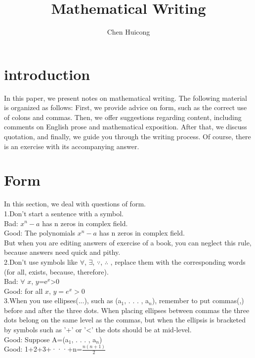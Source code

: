 \documentclass[]{article}
\title{Mathematical Writing}
\author{Chen Huicong}
\begin{document}
	
	\maketitle
	
	\tableofcontents 
	
	\newpage 
	
	\section{introduction}
	In this paper, we present notes on mathematical writing. The following material is organized as follows: First, we provide advice on form, such as the correct use of colons and commas. Then, we offer suggestions regarding content, including comments on English prose and mathematical exposition. After that, we discuss quotation, and finally, we guide you through the writing process. Of course, there is an exercise with its accompanying answer.
	
	\section{Form}
	In this section, we deal with questions of form. \\
	1.Don't start a sentence with a symbol. \\
	\indent Bad:
	\(x^n-a\) has n zeros in complex field. 
	\\
	\indent Good: 
	The polynomials \(x^n-a\) has n zeros in complex field. \\
	But when you are editing answers of exercise of a book, you can neglect this rule, because answers need quick and pithy. \\
	
	\noindent 2.Don't use symbols like $\forall$, $\exists$, $\because$, $\therefore$ , replace them with the corresponding words (for all, exists, because, therefore).\\
	\indent Bad: \(\forall\) $x$, $y$=e$^x$>0\\
	\indent Good: for all $x$, \(y=e^x>0
	\)\\
	
	\noindent3.When you use ellipses(...), such as (a\(_1\), . . . , a\(_n\)), remember to put commas(,) before and
	after the three dots. When placing ellipses between commas the three dots belong
	on the same level as the commas, but when the ellipsis is bracketed by symbols such
	as '+' or '<' the dots should be at mid-level.\\
	\indent Good: Suppose A=(a\(_1\), . . . , a\(_n\))\\
	\indent Good: 1+2+3+···+n=\(\frac{n(n+1)}{2}\)\\
	
\end{document}
